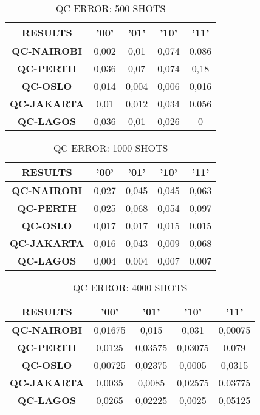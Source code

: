 \begin{table}[!ht]
    \centering
    \begin{tabular}{ccccc}
    \hline
        \textbf{RESULTS} & \textbf{'00'} & \textbf{'01'} & \textbf{'10'} & \textbf{'11' } \\ \hline
        \textbf{QC-NAIROBI} & 0,002 & 0,01 & 0,074 & 0,086  \\ 
        \textbf{QC-PERTH} & 0,036 & 0,07 & 0,074 & 0,18  \\ 
        \textbf{QC-OSLO} & 0,014 & 0,004 & 0,006 & 0,016  \\ 
        \textbf{QC-JAKARTA} & 0,01 & 0,012 & 0,034 & 0,056  \\ 
        \textbf{QC-LAGOS} & 0,036 & 0,01 & 0,026 & 0 \\ \hline
    \end{tabular}
    \caption{QC ERROR: 500 SHOTS}
\end{table}

\begin{table}[!ht]
    \centering
    \begin{tabular}{ccccc}
    \hline
        \textbf{RESULTS} & \textbf{'00'} & \textbf{'01'} & \textbf{'10'} & \textbf{'11' } \\ \hline
        \textbf{QC-NAIROBI} & 0,027 & 0,045 & 0,045 & 0,063  \\ 
        \textbf{QC-PERTH} & 0,025 & 0,068 & 0,054 & 0,097  \\ 
        \textbf{QC-OSLO} & 0,017 & 0,017 & 0,015 & 0,015  \\ 
        \textbf{QC-JAKARTA} & 0,016 & 0,043 & 0,009 & 0,068  \\ 
        \textbf{QC-LAGOS} & 0,004 & 0,004 & 0,007 & 0,007 \\ \hline
    \end{tabular}
    \caption{QC ERROR: 1000 SHOTS}
\end{table}

\begin{table}[!ht]
    \centering
    \begin{tabular}{ccccc}
    \hline
        \textbf{RESULTS} & \textbf{'00'} & \textbf{'01'} & \textbf{'10'} & \textbf{'11' } \\ \hline
        \textbf{QC-NAIROBI} & 0,01675 & 0,015 & 0,031 & 0,00075  \\ 
        \textbf{QC-PERTH} & 0,0125 & 0,03575 & 0,03075 & 0,079  \\ 
        \textbf{QC-OSLO} & 0,00725 & 0,02375 & 0,0005 & 0,0315  \\ 
        \textbf{QC-JAKARTA} & 0,0035 & 0,0085 & 0,02575 & 0,03775  \\ 
        \textbf{QC-LAGOS} & 0,0265 & 0,02225 & 0,0025 & 0,05125 \\ \hline
    \end{tabular}
    \caption{QC ERROR: 4000 SHOTS}
\end{table}

